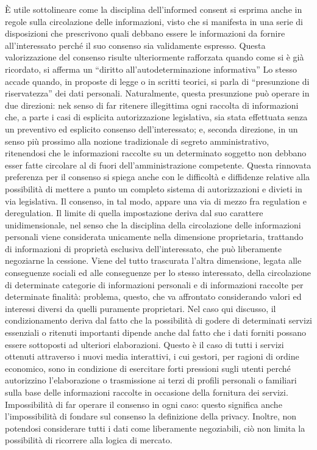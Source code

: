 È utile sottolineare come la disciplina dell’informed consent si esprima anche in regole sulla circolazione delle informazioni, visto che si manifesta in una serie di disposizioni che prescrivono quali debbano essere le informazioni da fornire all’interessato perché il suo consenso sia validamente espresso.
Questa valorizzazione del consenso risulte ulteriormente rafforzata quando come si è già ricordato, si afferma un “diritto all’autodeterminazione informativa” Lo stesso accade quando, in proposte di legge o in scritti teorici, si parla di “presunzione di riservatezza” dei dati personali. Naturalmente, questa presunzione può operare in due direzioni: nek senso di far ritenere illegittima ogni raccolta di informazioni che, a parte i casi di esplicita autorizzazione legislativa, sia stata effettuata senza un preventivo ed esplicito consenso dell’interessato; e, seconda direzione, in un senso più prossimo alla nozione tradizionale di segreto amministrativo, ritenendosi che le informazioni raccolte su un determinato soggetto non debbano esser fatte circolare al di fuori dell’amministrazione competente.
Questa rinnovata preferenza per il consenso si spiega anche con le difficoltà e diffidenze relative alla possibilità di mettere a punto un completo sistema di autorizzazioni e divieti in via legislativa. Il consenso, in tal modo, appare una via di mezzo fra regulation e deregulation. Il limite di quella impostazione deriva dal suo carattere unidimensionale, nel senso che la disciplina della circolazione delle informazioni personali viene considerata unicamente nella dimensione proprietaria, trattando di informazioni di proprietà esclusiva dell’interessato, che può liberamente negoziarne la cessione. Viene del tutto trascurata l’altra dimensione, legata alle conseguenze sociali ed alle conseguenze per lo stesso interessato, della circolazione di determinate categorie di informazioni personali e di informazioni raccolte per determinate finalità: problema, questo, che va affrontato considerando valori ed interessi diversi da quelli puramente proprietari. 
Nel caso qui discusso, il condizionamento deriva dal fatto che la possibilità di godere di determinati servizi essenziali o ritenuti importanti dipende anche dal fatto che i dati forniti possano essere sottoposti ad ulteriori elaborazioni. Questo è il caso di tutti i servizi ottenuti attraverso i nuovi media interattivi, i cui gestori, per ragioni di ordine economico, sono in condizione di esercitare forti pressioni sugli utenti perché autorizzino l’elaborazione o trasmissione ai terzi di profili personali o familiari sulla base delle informazioni raccolte in occasione della fornitura dei servizi. Impossibilità di far operare il consenso in ogni caso: questo significa anche l’impossibilità di fondare sul consenso la definizione della privacy. Inoltre, non potendosi considerare tutti i dati come liberamente negoziabili, ciò non limita la possibilità di ricorrere alla logica di mercato.
